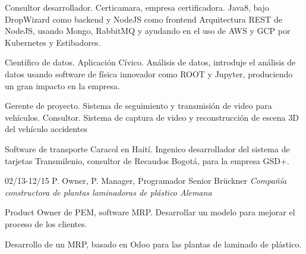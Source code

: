 \begin{entrylist}
{Consultor desarrollador. Certicamara, empresa certificadora. Java8, bajo
DropWizard como backend y NodeJS como frontend Arquitectura REST de NodeJS,
usando Mongo, RabbitMQ y ayudando en el uso de AWS y GCP por Kubernetes
y Estibadores.

Científico de datos. Aplicación Cívico. Análisis de datos, introduje el análisis de datos usando
software de física innovador como ROOT y Jupyter, produciendo un gran impacto en
la empresa.

Gerente de proyecto. Sistema de seguimiento y transmisión de video para vehículos.
Consultor. Sistema de captura de video y reconstrucción de escena 3D del vehículo
accidentes


Software de transporte Caracol en Haití. Ingenico desarrollador del sistema de tarjetas Transmilenio,
consultor de Recaudos Bogotá, para la empresa GSD+.}
  \entry
	{02/13-12/15}
	{P. Owner, P. Manager, Programador Senior}
	{Brückner {\sl Compañía constructora de plantas laminadoras de plástico Alemana}}
	{Product Owner de PEM, software MRP. Desarrollar un modelo para mejorar el proceso de los clientes.

	Desarrollo de un MRP, basado en Odoo para las plantas de laminado de plástico.}

\end{entrylist}
\newpage
%

